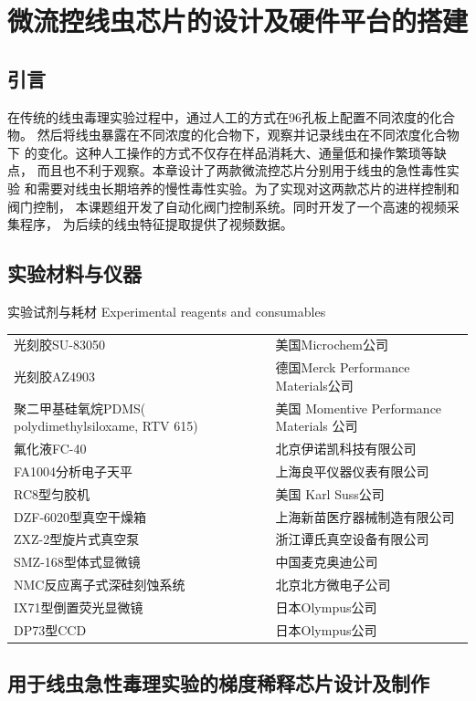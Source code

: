 \chapter{微流控线虫芯片的设计及硬件平台的搭建}
\section{引言}
	在传统的线虫毒理实验过程中，通过人工的方式在96孔板上配置不同浓度的化合物。
	然后将线虫暴露在不同浓度的化合物下，观察并记录线虫在不同浓度化合物下
	的变化。这种人工操作的方式不仅存在样品消耗大、通量低和操作繁琐等缺点， 
	而且也不利于观察。本章设计了两款微流控芯片分别用于线虫的急性毒性实验
	和需要对线虫长期培养的慢性毒性实验。为了实现对这两款芯片的进样控制和阀门控制，
	本课题组开发了自动化阀门控制系统。同时开发了一个高速的视频采集程序，
	为后续的线虫特征提取提供了视频数据。
\section{实验材料与仪器}
	\begin{table}[htbp]
	\centering
	\bicaption
    {实验试剂与耗材}
    {Experimental reagents and consumables}
	\begin{tabular}{p{150pt}p{230pt}}
	\toprule
		光刻胶SU-83050 & 美国Microchem公司\\
		光刻胶AZ4903 & 德国Merck Performance Materials公司\\
		聚二甲基硅氧烷PDMS( polydimethylsiloxame, RTV 615) &美国 Momentive Performance Materials 公司\\
		氟化液FC-40 & 北京伊诺凯科技有限公司\\
		FA1004分析电子天平 & 上海良平仪器仪表有限公司\\
		RC8型匀胶机 & 美国 Karl Suss公司\\
		DZF-6020型真空干燥箱& 上海新苗医疗器械制造有限公司\\
		ZXZ-2型旋片式真空泵 & 浙江谭氏真空设备有限公司\\
		SMZ-168型体式显微镜& 中国麦克奥迪公司 \\
		NMC反应离子式深硅刻蚀系统 & 北京北方微电子公司\\
		IX71型倒置荧光显微镜 & 日本Olympus公司\\
		DP73型CCD & 日本Olympus公司\\
	\bottomrule
	\end{tabular}
	\end{table}	
\section{用于线虫急性毒理实验的梯度稀释芯片设计及制作}
